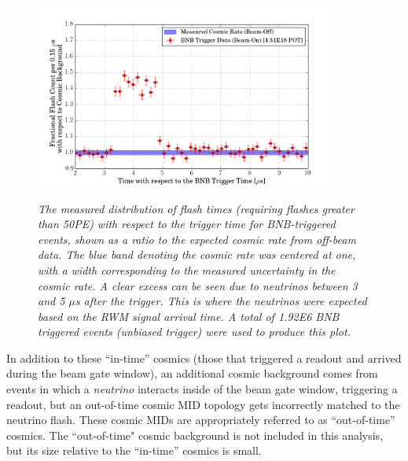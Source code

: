 \begin{figure}[ht!]
\centering
\includegraphics[width=0.9\textwidth]{Figures/BNB_flashtimeplot.png}\\
\caption{\textit{The measured distribution of flash times (requiring flashes greater than 50PE) with respect to the trigger time for BNB-triggered events, shown as a ratio to the expected cosmic rate from off-beam data. The blue band denoting the cosmic rate was centered at one, with a width corresponding to the measured uncertainty in the cosmic rate. A clear excess can be seen due to neutrinos between 3 and 5 $\mu$s after the trigger. This is where the neutrinos were expected based on the RWM signal arrival time. A total of 1.92E6 BNB triggered events (unbiased trigger) were used to produce this plot.}}
\label{BNB_flashtime_data_plot}
\end{figure}


In addition to these ``in-time'' cosmics (those that triggered a readout and arrived during the beam gate window), an additional cosmic background comes from events in which a \textit{neutrino} interacts inside of the beam gate window, triggering a readout, but an out-of-time cosmic MID topology gets incorrectly matched to the neutrino flash. These cosmic MIDs are appropriately referred to as ``out-of-time'' cosmics. The ``out-of-time" cosmic background is not included in this analysis, but its size relative to the ``in-time'' cosmics is small.\\

